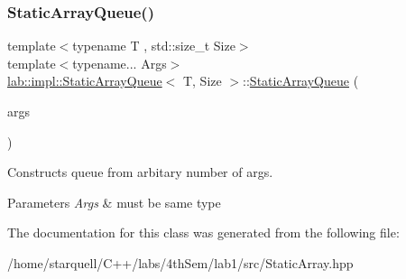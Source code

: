 \subsubsection{\texorpdfstring{Static\+Array\+Queue()}{StaticArrayQueue()}}
{\footnotesize\ttfamily template$<$typename T , std\+::size\+\_\+t Size$>$ \\
template$<$typename... Args$>$ \\
\hyperlink{classlab_1_1impl_1_1StaticArrayQueue}{lab\+::impl\+::\+Static\+Array\+Queue}$<$ T, Size $>$\+::\hyperlink{classlab_1_1impl_1_1StaticArrayQueue}{Static\+Array\+Queue} (\begin{DoxyParamCaption}\item[{Args \&\&...}]{args }\end{DoxyParamCaption})}



Constructs queue from arbitary number of args. 


\begin{DoxyParams}{Parameters}
{\em Args} & must be same type \\
\hline
\end{DoxyParams}


The documentation for this class was generated from the following file\+:\begin{DoxyCompactItemize}
\item 
/home/starquell/\+C++/labs/4th\+Sem/lab1/src/Static\+Array.\+hpp\end{DoxyCompactItemize}
